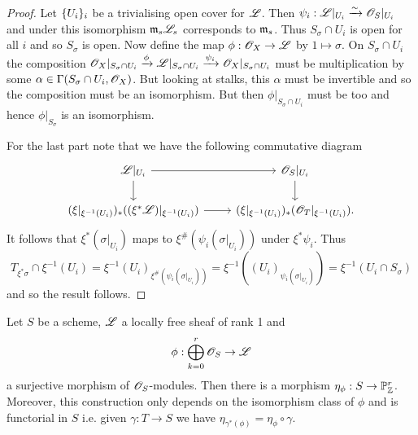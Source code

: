 \documentclass{memoir}
\begin{document}
\begin{proof}
    Let $\lbrace U_i\rbrace_i$ be a trivialising open cover for $\mathscr{L}$.
    Then $\psi_i:\mathscr{L}|_{U_i}\xrightarrow{\sim}\mathscr{O}_S|_{U_i}$ and under this isomorphism $\mathfrak{m}_s\mathscr{L}_s$ corresponds to $\mathfrak{m}_s$.
    Thus $S_\sigma\cap U_i$ is open for all $i$ and so $S_\sigma$ is open.
    Now define the map $\phi:\mathscr{O}_X\to \mathscr{L}$ by $1\mapsto \sigma$.
    On $S_\sigma \cap U_i$ the composition $\mathscr{O}_X|_{S_\sigma \cap U_i}\xrightarrow{\phi}\mathscr{L}|_{S_\sigma \cap U_i}\xrightarrow{\psi_i}\mathscr{O}_X|_{S_\sigma \cap U_i}$ must be multiplication by some $\alpha\in \Gamma(S_\sigma \cap U_i,\mathscr{O}_X)$.
    But looking at stalks, this $\alpha$ must be invertible and so the composition must be an isomorphism.
    But then $\phi|_{S_\sigma\cap U_i}$ must be too and hence $\phi|_{S_\sigma}$ is an isomorphism.

    For the last part note that we have the following commutative diagram
    \begin{equation}
        \begin{tikzcd}
            \shf{L}|_{U_i} \arrow[d] \arrow[r] & \shf{O}_S|_{U_i} \arrow[d] \\
            (\xi|_{\xi^{-1}(U_i)})_*((\xi^*\shf{L})|_{\xi^{-1}(U_i)}) \arrow[r] & (\xi|_{\xi^{-1}(U_i)})_*(\shf{O}_T|_{\xi^{-1}(U_i)}).
        \end{tikzcd}
    \end{equation}
    It follows that $\xi^*(\sigma|_{U_i})$ maps to $\xi^\#(\psi_i(\sigma|_{U_i}))$ under $\xi^*\psi_i$.
    Thus 
    \begin{equation}
        T_{\xi^*\sigma} \cap \xi^{-1}(U_i) = \xi^{-1}(U_i)_{\xi^\#(\psi_i(\sigma|_{U_i}))} = \xi^{-1}\left((U_i)_{\psi_i(\sigma|_{U_i})}\right) = \xi^{-1}(U_i\cap S_{\sigma})
    \end{equation}
    and so the result follows.
\end{proof}
\begin{lemma}
    Let $S$ be a scheme, $\mathscr{L}$ a locally free sheaf of rank 1 and 
    \begin{equation}
        \phi:\bigoplus_{k=0}^r\mathscr{O}_S\to \mathscr{L}
    \end{equation}
    a surjective morphism of $\mathscr{O}_S$-modules.
    Then there is a morphism $\eta_\phi:S\to \mathbb{P}^r_{\mathbb{Z}}$.
    Moreover, this construction only depends on the isomorphism class of $\phi$ and is functorial in $S$ i.e. given $\gamma:T\to S$ we have $\eta_{\gamma^*(\phi)} = \eta_\phi\circ \gamma$.
\end{lemma}
\end{document}
